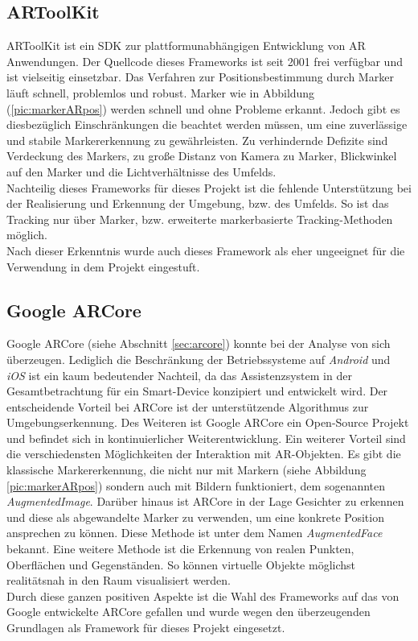 \subsection{ARToolKit}
ARToolKit ist ein \acs{SDK} zur plattformunabhängigen Entwicklung von \acl{AR} Anwendungen. Der Quellcode dieses Frameworks ist seit 2001 
frei verfügbar und ist vielseitig einsetzbar. Das Verfahren zur Positionsbestimmung durch Marker läuft schnell, problemlos und robust. Marker wie in 
Abbildung (\ref{pic:markerARpos}) werden schnell und ohne Probleme erkannt. Jedoch gibt es diesbezüglich Einschränkungen die beachtet werden 
müssen, um eine zuverlässige und stabile Markererkennung zu gewährleisten. Zu verhindernde Defizite sind Verdeckung des Markers, zu große Distanz 
von Kamera zu Marker, Blickwinkel auf den Marker und die Lichtverhältnisse des Umfelds. 
\\ 
Nachteilig dieses Frameworks für dieses Projekt ist die fehlende Unterstützung bei der Realisierung und Erkennung der Umgebung, bzw. des Umfelds.
So ist das Tracking nur über Marker, bzw. erweiterte markerbasierte Tracking-Methoden möglich. 
\\ %
Nach dieser Erkenntnis wurde auch dieses Framework als eher ungeeignet für die Verwendung in dem Projekt eingestuft. %
\subsection{Google ARCore}
Google ARCore (siehe Abschnitt \ref{sec:arcore}) konnte bei der Analyse von sich überzeugen. Lediglich die Beschränkung der
Betriebssysteme auf \textit{Android} und \textit{iOS} ist ein kaum bedeutender Nachteil, da das Assistenzsystem in der Gesamtbetrachtung 
für ein Smart-Device konzipiert und entwickelt wird. Der entscheidende Vorteil bei 
ARCore ist der unterstützende Algorithmus zur Umgebungserkennung. Des Weiteren ist Google ARCore ein Open-Source Projekt und befindet sich 
in kontinuierlicher Weiterentwicklung. %
Ein weiterer Vorteil sind die verschiedensten Möglichkeiten der Interaktion mit \acs{AR}-Objekten. Es gibt die 
klassische Markererkennung, die nicht nur mit Markern (siehe Abbildung \ref{pic:markerARpos}) sondern auch mit Bildern funktioniert, dem sogenannten
\textit{AugmentedImage}. Darüber hinaus ist ARCore in der Lage Gesichter zu erkennen und diese als abgewandelte Marker zu verwenden, um eine konkrete 
Position ansprechen zu können. Diese Methode ist unter dem Namen \textit{AugmentedFace} bekannt. Eine weitere Methode ist die Erkennung von 
realen Punkten, Oberflächen und Gegenständen. So können virtuelle Objekte möglichst realitätsnah in den Raum visualisiert werden.
\\
\linebreak
Durch diese ganzen positiven Aspekte ist die Wahl des Frameworks auf das von Google entwickelte ARCore gefallen und wurde wegen den überzeugenden 
Grundlagen als Framework für dieses Projekt eingesetzt.

